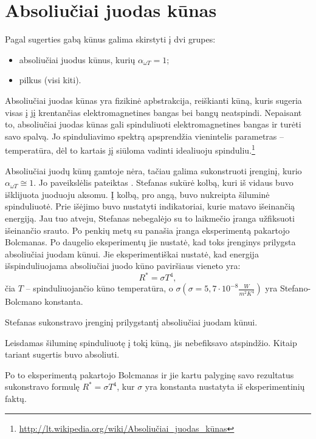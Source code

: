 \section{Absoliučiai juodas kūnas}

Pagal sugerties gabą kūnus galima skirstyti į dvi grupes:
\begin{itemize}
  \item absoliučiai juodus kūnus, kurių $\alpha_{\omega T} = 1$;
  \item pilkus (visi kiti).
\end{itemize}
Absoliučiai juodas kūnas yra fizikinė apbstrakcija, reiškianti
kūną, kuris sugeria visas į jį krentančias elektromagnetines bangas
bei bangų neatspindi. Nepaisant to, absoliučiai juodas kūnas gali
spinduliuoti elektromagnetines bangas ir turėti savo spalvą. Jo
spinduliavimo spektrą apsprendžia vienintelis parametras –
temperatūra, dėl to kartais jį siūloma vadinti idealiuoju
spinduliu.\footnote{
\url{http://lt.wikipedia.org/wiki/Absoliučiai_juodas_kūnas}}

Absoliučiai juodų kūnų gamtoje nėra, tačiau galima sukonstruoti
įrenginį, kurio $\alpha_{\omega T} \cong 1$. Jo paveikslėlis pateiktas
. Stefanas sukūrė kolbą, kuri iš vidaus buvo išklijuota
juoduoju aksomu. Į kolbą, pro angą, buvo nukreipta šiluminė
spinduliuotė. Prie išėjimo buvo nustatyti indikatoriai,
kurie matavo išeinančią energiją. Jau tuo atveju, Stefanas
nebegalėjo su to laikmečio įranga užfiksuoti išeinančio srauto. Po
penkių metų su panašia įranga eksperimentą pakartojo Bolcmanas. Po
daugelio eksperimentų jie nustatė, kad toks įrenginys prilygsta
absoliučiai juodam kūnui. Jie eksperimentiškai nustatė, kad 
energija išspinduliuojama absoliučiai juodo kūno paviršiaus
vieneto yra:
\begin{equation*}
  R^{*} = \sigma T^{4},
\end{equation*}
čia $T$ – spinduliuojančio kūno temperatūra, o
$\sigma (\sigma = 5,7 \cdot 10^{-8}\frac{W}{m^{2}K^{4}})$ yra 
Stefano-Bolcmano konstanta.

\begin{remember}
  \item Stefanas sukonstravo įrenginį prilygstantį absoliučiai juodam
    kūnui.
  \item Leisdamas šiluminę spinduliuotę į tokį kūną, jis nebefiksavo
    atspindžio. Kitaip tariant sugertis buvo absoliuti.
  \item Po to eksperimentą pakartojo Bolcmanas ir jie kartu palyginę
    savo rezultatus sukonstravo formulę $R^{*} = \sigma T^{4}$, kur
    $\sigma$ yra konstanta nustatyta iš eksperimentinių faktų.
\end{remember}

